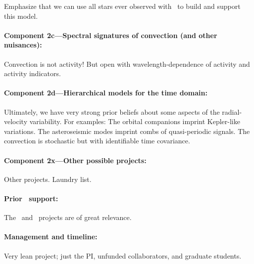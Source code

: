 \documentclass[12pt, fullpage, letterpaper]{article}
\begin{document}
Emphasize that we can use all stars ever observed with \HARPS\ to
build and support this model.

\paragraph{Component 2c---Spectral signatures of convection (and other nuisances):}
Convection is not activity! But open with wavelength-dependence of
activity and activity indicators.

\paragraph{Component 2d---Hierarchical models for the time domain:}
Ultimately, we have very strong prior beliefs about some aspects
of the radial-velocity variability. For examples: The orbital
companions imprint Kepler-like variations. The asteroseismic modes
imprint combs of quasi-periodic signals. The convection is stochastic
but with identifiable time covariance.

\paragraph{Component 2x---Other possible projects:}
Other projects. Laundry list.

\paragraph{Prior \NASA\ support:}
The \GALEX\ and \Ktwo\ projects are of great relevance.

\paragraph{Management and timeline:}
Very lean project; just the PI, unfunded collaborators, and graduate students.
\end{document}
